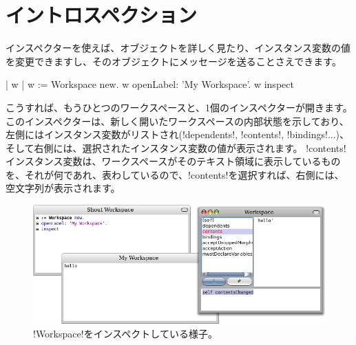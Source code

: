 \documentclass[a4paper,10pt,twoside]{book}
\begin{document}
\section{イントロスペクション}

インスペクターを使えば、オブジェクトを詳しく見たり、インスタンス変数の値を変更できますし、そのオブジェクトにメッセージを送ることさえできます。

\begin{code}{| w |}
w := Workspace new.
w openLabel: 'My Workspace'.
w inspect
\end{code}

こうすれば、もうひとつのワークスペースと、1個のインスペクターが開きます。
このインスペクターは、新しく開いたワークスペースの内部状態を示しており、左側にはインスタンス変数がリストされ(\ct!dependents!, \ct!contents!, \ct!bindings!...)、そして右側には、選択されたインスタンス変数の値が表示されます。
\ct!contents!インスタンス変数は、ワークスペースがそのテキスト領域に表示しているものを、それが何であれ、表わしているので、\ct!contents!を選択すれば、右側には、空文字列が表示されます。

\begin{figure}[ht]\centering
	\includegraphics[width=\linewidth]{workspaceInspector}
	\caption{\ct!Workspace!をインスペクトしている様子。}
\end{figure}
\end{document}
